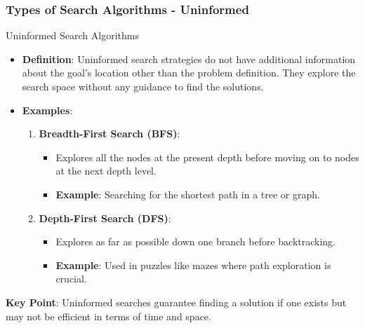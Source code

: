 \documentclass[aspectratio=169]{beamer}
\begin{document}
\begin{frame}[fragile]
    \frametitle{Types of Search Algorithms - Uninformed}
    \begin{block}{Uninformed Search Algorithms}
        \begin{itemize}
            \item \textbf{Definition}: Uninformed search strategies do not have additional information about the goal's location other than the problem definition. They explore the search space without any guidance to find the solutions.
            
            \item \textbf{Examples}:
                \begin{enumerate}
                    \item \textbf{Breadth-First Search (BFS)}: 
                        \begin{itemize}
                            \item Explores all the nodes at the present depth before moving on to nodes at the next depth level.
                            \item \textbf{Example}: Searching for the shortest path in a tree or graph.
                        \end{itemize}
                    \item \textbf{Depth-First Search (DFS)}:
                        \begin{itemize}
                            \item Explores as far as possible down one branch before backtracking.
                            \item \textbf{Example}: Used in puzzles like mazes where path exploration is crucial.
                        \end{itemize}
                \end{enumerate}
        \end{itemize}
        
        \textbf{Key Point}: Uninformed searches guarantee finding a solution if one exists but may not be efficient in terms of time and space.
    \end{block}
\end{frame}
\end{document}
